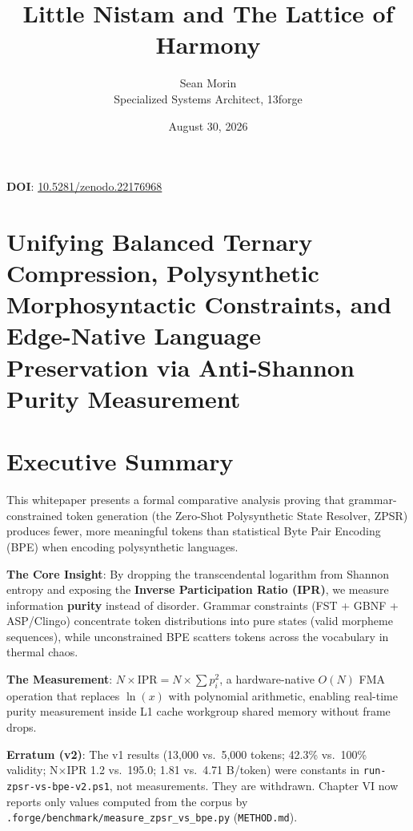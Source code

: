 \documentclass[11pt,oneside]{article}
\title{Little Nistam and The Lattice of Harmony}
\author{Sean Morin \\ Specialized Systems Architect, 13forge}
\date{August 30, 2026}
\begin{document}
\maketitle

\begin{center}
\textbf{DOI}: \href{https://doi.org/10.5281/zenodo.22176968}{10.5281/zenodo.22176968}
\end{center}

\section*{Unifying Balanced Ternary Compression, Polysynthetic Morphosyntactic Constraints, and Edge-Native Language Preservation via Anti-Shannon Purity Measurement}

\section*{Executive Summary}

This whitepaper presents a formal comparative analysis proving that grammar-constrained token generation (the Zero-Shot Polysynthetic State Resolver, ZPSR) produces fewer, more meaningful tokens than statistical Byte Pair Encoding (BPE) when encoding polysynthetic languages.

\textbf{The Core Insight}: By dropping the transcendental logarithm from Shannon entropy and exposing the \textbf{Inverse Participation Ratio (IPR)}, we measure information \textbf{purity} instead of disorder. Grammar constraints (FST + GBNF + ASP/Clingo) concentrate token distributions into pure states (valid morpheme sequences), while unconstrained BPE scatters tokens across the vocabulary in thermal chaos.

\textbf{The Measurement}: $N \times \text{IPR} = N \times \sum p_i^2$, a hardware-native $O(N)$ FMA operation that replaces $\ln(x)$ with polynomial arithmetic, enabling real-time purity measurement inside L1 cache workgroup shared memory without frame drops.

\textbf{Erratum (v2)}: The v1 results (13,000 vs.\ 5,000 tokens; 42.3\% vs.\ 100\% validity; N×IPR 1.2 vs.\ 195.0; 1.81 vs.\ 4.71 B/token) were constants in \texttt{run-zpsr-vs-bpe-v2.ps1}, not measurements. They are withdrawn. Chapter VI now reports only values computed from the corpus by \texttt{.forge/benchmark/measure\_zpsr\_vs\_bpe.py} (\texttt{METHOD.md}).
\end{document}
